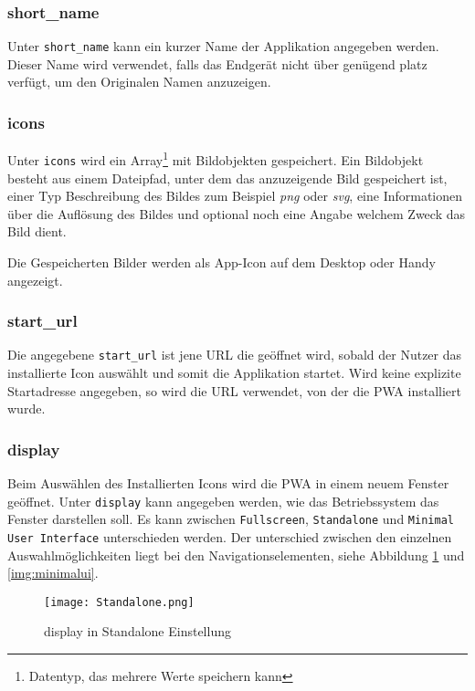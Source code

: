 \subsubsection{short\_name}
Unter \texttt{short\_name} kann ein kurzer Name der Applikation angegeben werden. Dieser Name wird verwendet, falls das Endgerät nicht über genügend platz verfügt, um den Originalen Namen anzuzeigen. 

\subsubsection{icons}
Unter \texttt{icons} wird ein Array\footnote{Datentyp, das mehrere Werte speichern kann} mit Bildobjekten gespeichert. Ein Bildobjekt besteht aus einem Dateipfad, unter dem das anzuzeigende Bild gespeichert ist, einer Typ Beschreibung des Bildes zum Beispiel \textit{png} oder \textit{svg}, eine Informationen über die Auflösung des Bildes und optional noch eine Angabe  welchem Zweck das Bild dient. 

Die Gespeicherten Bilder werden als App-Icon auf dem Desktop oder Handy angezeigt. 

\subsubsection{start\_url}
Die angegebene \texttt{start\_url} ist jene \ac{URL} die geöffnet wird, sobald der Nutzer das installierte Icon auswählt und somit die Applikation startet. 
Wird keine explizite Startadresse angegeben, so wird die URL verwendet, von der die PWA installiert wurde. 

\subsubsection{display}

Beim Auswählen des Installierten Icons wird die PWA in einem neuem Fenster geöffnet. Unter \texttt{display} kann angegeben werden, wie das Betriebssystem das Fenster darstellen soll. 
Es kann zwischen \texttt{Fullscreen}, \texttt{Standalone} und \texttt{Minimal User Interface} unterschieden werden. 
Der unterschied zwischen den einzelnen Auswahlmöglichkeiten liegt bei den Navigationselementen, siehe Abbildung \ref{img:Standalone} und \ref{img:minimalui}.

\begin{figure}[!htb]
    \texttt{[image: Standalone.png]}
    \caption{display in Standalone Einstellung}
    \label{img:Standalone}
\end{figure}

